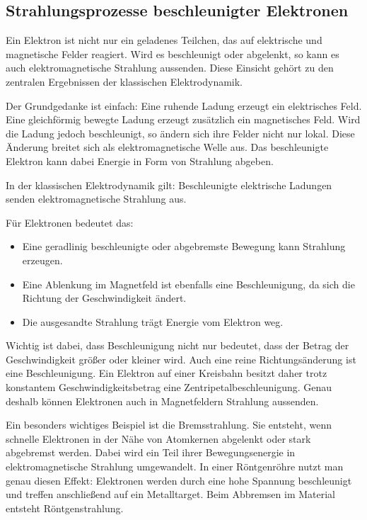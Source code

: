 \subsection{Strahlungsprozesse beschleunigter Elektronen}
\label{subsec:strahlungsprozesse-beschleunigter-elektronen}

Ein Elektron ist nicht nur ein geladenes Teilchen, das auf elektrische und
magnetische Felder reagiert. Wird es beschleunigt oder abgelenkt, so kann es
auch elektromagnetische Strahlung aussenden. Diese Einsicht gehört zu den
zentralen Ergebnissen der klassischen Elektrodynamik.

Der Grundgedanke ist einfach: Eine ruhende Ladung erzeugt ein elektrisches
Feld. Eine gleichförmig bewegte Ladung erzeugt zusätzlich ein magnetisches
Feld. Wird die Ladung jedoch beschleunigt, so ändern sich ihre Felder nicht
nur lokal. Diese Änderung breitet sich als elektromagnetische Welle aus. Das
beschleunigte Elektron kann dabei Energie in Form von Strahlung abgeben.

\begin{PhysicsBox}
	\label{box:beschleunigte-ladungen-strahlen}
	In der klassischen Elektrodynamik gilt:
	Beschleunigte elektrische Ladungen senden elektromagnetische Strahlung aus.
	
	Für Elektronen bedeutet das:
	\begin{itemize}
		\item Eine geradlinig beschleunigte oder abgebremste Bewegung kann Strahlung erzeugen.
		\item Eine Ablenkung im Magnetfeld ist ebenfalls eine Beschleunigung, da sich die
		Richtung der Geschwindigkeit ändert.
		\item Die ausgesandte Strahlung trägt Energie vom Elektron weg.
	\end{itemize}
\end{PhysicsBox}

Wichtig ist dabei, dass Beschleunigung nicht nur bedeutet, dass der Betrag der
Geschwindigkeit größer oder kleiner wird. Auch eine reine Richtungsänderung ist
eine Beschleunigung. Ein Elektron auf einer Kreisbahn besitzt daher trotz
konstantem Geschwindigkeitsbetrag eine Zentripetalbeschleunigung. Genau deshalb
können Elektronen auch in Magnetfeldern Strahlung aussenden.

Ein besonders wichtiges Beispiel ist die Bremsstrahlung.
Sie entsteht, wenn schnelle Elektronen in der Nähe von Atomkernen abgelenkt
oder stark abgebremst werden. Dabei wird ein Teil ihrer Bewegungsenergie in
elektromagnetische Strahlung umgewandelt.
\newpage
\noindent
In einer Röntgenröhre nutzt man genau diesen Effekt:
Elektronen werden durch eine hohe Spannung beschleunigt und treffen anschließend
auf ein Metalltarget. Beim Abbremsen im Material entsteht
Röntgenstrahlung.

